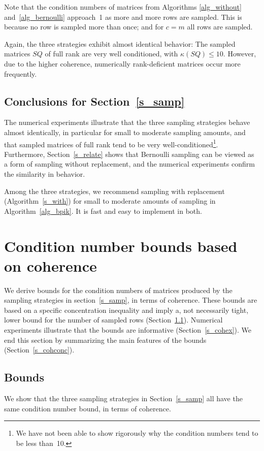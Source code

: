 \documentclass{siamltex}
\begin{document}
Note that the condition numbers of matrices from Algorithms
\ref{alg_without} and~\ref{alg_bernoulli} approach~1 as more and more
rows are sampled. This is because 
no row is sampled more than once; and for $c=m$ all rows are sampled.

Again, the three strategies exhibit almost identical behavior: The sampled
matrices $SQ$ of full rank are very well conditioned, with $\kappa(SQ)\leq 10$.
However, due to the higher coherence, numerically
rank-deficient matrices occur more frequently.

\subsection{Conclusions for Section~\ref{s_samp}}\label{s_sampconc}
The numerical experiments illustrate that the
three sampling strategies behave almost identically, in particular
for small to moderate
sampling amounts, and that sampled matrices of full rank tend to be
very well-conditioned\footnote{We have not been able to show rigorously
why the condition numbers tend to be less than~10.}. 
Furthermore, Section~\ref{s_relate} shows that Bernoulli
sampling can be viewed as a form of sampling without replacement,
and the numerical experiments confirm the similarity in behavior.

Among the three strategies, we recommend sampling with replacement
(Algorithm~\ref{s_with}) for small to moderate amounts of sampling
in Algorithm~\ref{alg_bpik}.
It is fast and easy to implement in both.

 

\section{Condition number bounds based on coherence}\label{s_cohbound}
We derive bounds for the condition numbers of matrices produced by the
sampling strategies in section~\ref{s_samp},
in terms of coherence. These bounds are based on a specific
concentration inequality and imply a, not necessarily tight, lower bound
for the number of sampled rows 
(Section~\ref{s_subcohbound}). Numerical experiments illustrate that
the bounds are informative (Section~\ref{s_cohex}). We end this 
section by summarizing the main features of the bounds 
(Section~\ref{s_cohconc}).

\subsection{Bounds}\label{s_subcohbound}
We show that the three sampling strategies in Section~\ref{s_samp}
all have the same condition number bound, in terms of coherence. 
\end{document}
